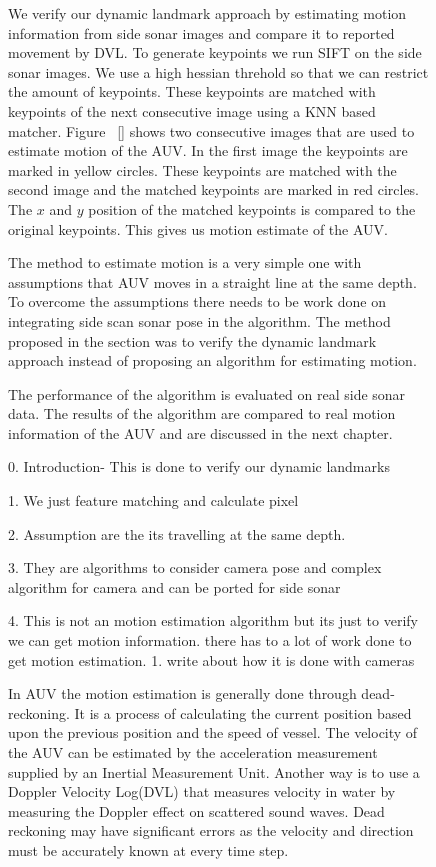 \documentclass[12pt,draft]{dalcsthesis}
\begin{document}
{{\begin{figure}
{We verify our dynamic landmark approach by estimating motion information from side sonar images and compare it to reported movement by DVL. To generate keypoints we run SIFT on the side sonar images. We use a high hessian threhold so that we can restrict the amount of keypoints. These keypoints are matched with keypoints of the next consecutive image using a KNN based matcher. Figure ~\ref{} shows two consecutive images that are used to estimate motion of the AUV. In the first image the keypoints are marked in yellow circles. These keypoints are matched with the second image and the matched keypoints are marked in red circles. The $x$ and $y$ position of the matched keypoints is compared to the original keypoints. This gives us motion estimate of the AUV. 

The method to estimate motion is a very simple one with assumptions that AUV moves in a straight line at the same depth. To overcome the assumptions there needs to be work done on integrating side scan sonar pose in the algorithm. The method proposed in the section was to verify the dynamic landmark approach instead of proposing an algorithm for estimating motion. 

The performance of the algorithm is evaluated on real side sonar data. The results of the algorithm are compared to real motion information of the AUV and are discussed in the next chapter. 


0. Introduction- This is done to verify our dynamic landmarks

1. We just feature matching and calculate pixel

2. Assumption are the its travelling at the same depth. 

3. They are algorithms to consider camera pose and complex algorithm for camera and can be ported for side sonar 

4. This is not an motion estimation algorithm but its just to verify we can get motion information. there has to a lot of work done to get motion estimation.  
1. write about how it is done with cameras

In AUV the motion estimation is generally done through dead-reckoning.
It is a process of calculating the current position based upon the
previous position and the speed of vessel. The velocity of the AUV
can be estimated by the acceleration measurement supplied by an Inertial
Measurement Unit. Another way is to use a Doppler Velocity Log(DVL) that
measures velocity in water by measuring the Doppler effect on scattered
sound waves. Dead reckoning may have significant errors as the velocity
and direction must be accurately known at every time step. 

}
\end{figure}}}
\end{document}

